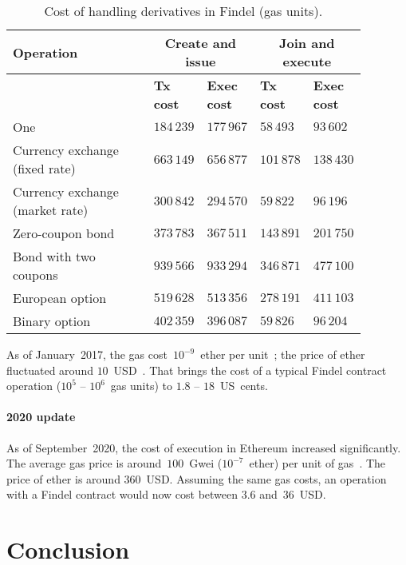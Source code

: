 \begin{table}
	\centering
	\caption{Cost of handling derivatives in Findel (gas units).}
	\begin{tabular}{|p{0.4\linewidth}|p{0.12\linewidth}|p{0.12\linewidth}|p{0.12\linewidth}|p{0.12\linewidth}|}
		\hline
		\textbf{Operation} & \multicolumn{2}{|c|}{\textbf{Create and issue}} & \multicolumn{2}{|c|}{\textbf{Join and execute}}\\
		\hline
		& \textbf{Tx cost} & \textbf{Exec cost} & \textbf{Tx cost} & \textbf{Exec cost} \\
		\hline
		One & $184\,239$ & $177\,967$ & $58\,493$ & $93\,602$ \\
		\hline
		Currency exchange (fixed rate) & $663\,149$ & $656\,877$ & $101\,878$ & $138\,430$ \\
		\hline
		Currency exchange (market rate) & $300\,842$ & $294\,570$ & $59\,822$ & $96\,196$ \\
		\hline
		Zero-coupon bond & $373\,783$ & $367\,511$ & $143\,891$ & $201\,750$ \\
		\hline
		Bond with two coupons & $939\,566$ & $933\,294$ & $346\,871$ & $477\,100$ \\
		\hline
		European option & $519\,628$ & $513\,356$ & $278\,191$ & $411\,103$ \\
		\hline
		Binary option & $402\,359$ & $396\,087$ & $59\,826$ & $96\,204$ \\
		\hline
	\end{tabular}
	\label{tab:Ch10FindelCost2}
\end{table}

As of January~2017, the gas cost~$10^{-9}$~ether per unit~\cite{Ethstats}; the price of ether fluctuated around $10$~USD~\cite{Worldcoinindex}.
That brings the cost of a typical Findel contract operation ($10^5$ -- $10^6$~gas units) to $1.8$ -- $18$~US~cents.

\paragraph{2020 update}
As of September~2020, the cost of execution in Ethereum increased significantly.
The average gas price is around~$100$~Gwei ($10^{-7}$~ether) per unit of gas~\cite{EGS}.
The price of ether is around $360$~USD\@.
Assuming the same gas costs, an operation with a Findel contract would now cost between $3.6$ and~$36$~USD\@.


\section{Conclusion}

